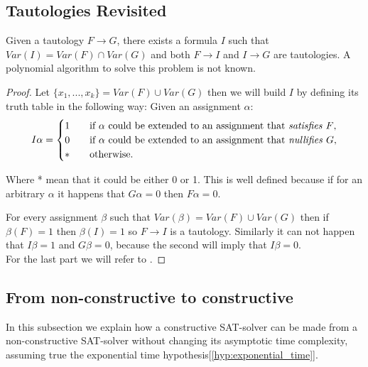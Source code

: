   \subsection{Tautologies Revisited}

  \begin{proposition}
    Given a tautology $F \to G$, there exists a formula $I$ such that $Var(I) = Var(F)\cap Var(G)$ and both $F\to I$ and $I \to G$ are tautologies. A polynomial algorithm to solve this problem is not known. 
  \end{proposition}

  \begin{proof} Let $\{x_1,...,x_k\} = Var(F)\cup Var(G)$ then we will build $I$ by defining its truth table in the following way: Given an assignment $\alpha$:
    \[   
      I\alpha = 
      \begin{cases}
        1&\quad\text{if $\alpha$ could be extended to an assignment that \emph{satisfies} $F$}, \\
        0&\quad\text{if $\alpha$ could be extended to an assignment that \emph{nullifies} $G$},\\
        * &\quad\text{otherwise.} \\ 
      \end{cases}
    \]

    Where * mean that it could be either 0 or 1.  This is well defined because if for an arbitrary $\alpha$ it happens that $G\alpha = 0$ then $F\alpha = 0$.

    For every assignment $\beta$ such that $Var(\beta) = Var(F)\cup Var(G)$ then if $\beta(F) = 1$ then $\beta(I) = 1$ so $F \to I$  is a tautology. Similarly it can not happen that $I\beta = 1 $ and $G\beta = 0$, because the second will imply that   $I\beta = 0$.\\

    For the last part we will refer to \cite{schoning2007note}.
  \end{proof}

  
  \subsection{From non-constructive to constructive}
  \label{sub:fromnon}
  In this subsection we explain how a constructive SAT-solver can be made from a non-constructive SAT-solver without changing its asymptotic time complexity, assuming true the exponential time hypothesis[\ref{hyp:exponential_time}]. 

